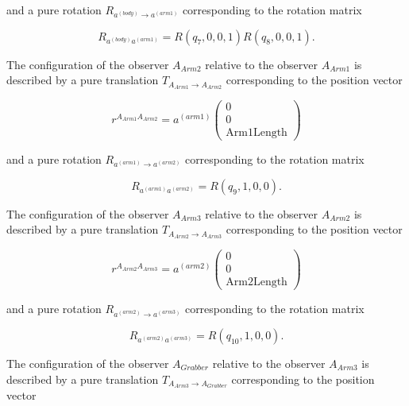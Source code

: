 \documentclass{article}
\begin{document}
and a pure rotation $R_{a^{(body)} \rightarrow a^{(arm1)}}$ corresponding to the rotation matrix

\begin{equation*}
R_{a^{(body)}a^{(arm1)}}=R(q_7,0,0,1)R(q_8,0,0,1)\text{.}
\end{equation*}%

The configuration of the observer $A_{Arm2}$ relative to the observer $A_{Arm1}$ is described by a pure translation $T_{A_{Arm1} \rightarrow A_{Arm2}}$ corresponding to the position vector

\begin{equation*}
r^{A_{Arm1}A_{Arm2}}=a^{(arm1)}\left(\begin{array}{c}
0 \\ 0 \\ \text{Arm1Length} \end{array}\right)
\end{equation*}

and a pure rotation $R_{a^{(arm1)} \rightarrow a^{(arm2)}}$ corresponding to the rotation matrix

\begin{equation*}
R_{a^{(arm1)}a^{(arm2)}}=R(q_9,1,0,0)\text{.}
\end{equation*}%

The configuration of the observer $A_{Arm3}$ relative to the observer $A_{Arm2}$ is described by a pure translation $T_{A_{Arm2} \rightarrow A_{Arm3}}$ corresponding to the position vector

\begin{equation*}
r^{A_{Arm2}A_{Arm3}}=a^{(arm2)}\left(\begin{array}{c}
0 \\ 0 \\ \text{Arm2Length} \end{array}\right)
\end{equation*}

and a pure rotation $R_{a^{(arm2)} \rightarrow a^{(arm3)}}$ corresponding to the rotation matrix

\begin{equation*}
R_{a^{(arm2)}a^{(arm3)}}=R(q_{10},1,0,0)\text{.}
\end{equation*}%

The configuration of the observer $A_{Grabber}$ relative to the observer $A_{Arm3}$ is described by a pure translation $T_{A_{Arm3} \rightarrow A_{Grabber}}$ corresponding to the position vector
\end{document}
